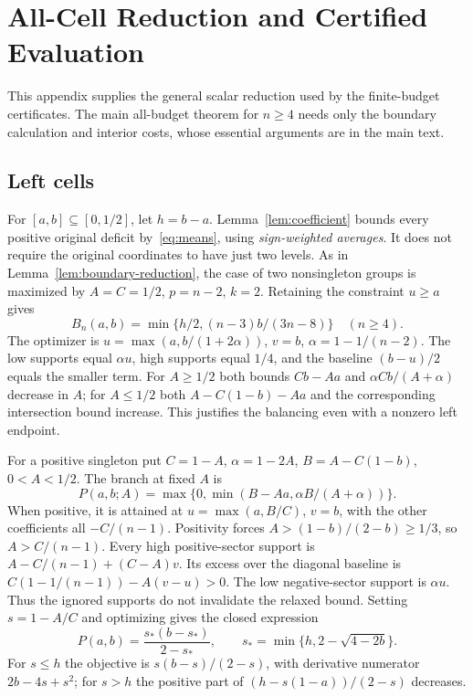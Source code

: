 \section{All-Cell Reduction and Certified Evaluation}\label{app:allcells}
This appendix supplies the general scalar reduction used by the finite-budget certificates. The main all-budget theorem for $n\ge4$ needs only the boundary calculation and interior costs, whose essential arguments are in the main text.

\subsection{Left cells}
For $[a,b]\subseteq[0,1/2]$, let $h=b-a$. Lemma~\ref{lem:coefficient} bounds every positive original deficit by~\eqref{eq:means}, using \emph{sign-weighted averages}. It does not require the original coordinates to have just two levels. As in Lemma~\ref{lem:boundary-reduction}, the case of two nonsingleton groups is maximized by $A=C=1/2$, $p=n-2$, $k=2$. Retaining the constraint $u\ge a$ gives
\begin{equation}\label{eq:allcell-balanced}
B_n(a,b)=\min\{h/2,(n-3)b/(3n-8)\}\quad(n\ge4).
\end{equation}
The optimizer is $u=\max(a,b/(1+2\alpha))$, $v=b$, $\alpha=1-1/(n-2)$. The low supports equal $\alpha u$, high supports equal $1/4$, and the baseline $(b-u)/2$ equals the smaller term. For $A\ge1/2$ both bounds $Cb-Aa$ and $\alpha Cb/(A+\alpha)$ decrease in $A$; for $A\le1/2$ both $A-C(1-b)-Aa$ and the corresponding intersection bound increase. This justifies the balancing even with a nonzero left endpoint.

For a positive singleton put $C=1-A$, $\alpha=1-2A$, $B=A-C(1-b)$, $0<A<1/2$. The branch at fixed $A$ is
\[
P(a,b;A)=\max\{0,\min(B-Aa,\alpha B/(A+\alpha))\}.
\]
When positive, it is attained at $u=\max(a,B/C)$, $v=b$, with the other coefficients all $-C/(n-1)$. Positivity forces $A>(1-b)/(2-b)\ge1/3$, so $A>C/(n-1)$. Every high positive-sector support is
$A-C/(n-1)+(C-A)v$.
Its excess over the diagonal baseline is $C(1-1/(n-1))-A(v-u)>0$. The low negative-sector support is $\alpha u$. Thus the ignored supports do not invalidate the relaxed bound. Setting $s=1-A/C$ and optimizing gives the closed expression
\begin{equation}\label{eq:allcell-positive}
P(a,b)=\frac{s_*(b-s_*)}{2-s_*},\qquad
s_*=\min\{h,2-\sqrt{4-2b}\}.
\end{equation}
For $s\le h$ the objective is $s(b-s)/(2-s)$, with derivative numerator $2b-4s+s^2$; for $s>h$ the positive part of $(h-s(1-a))/(2-s)$ decreases.

